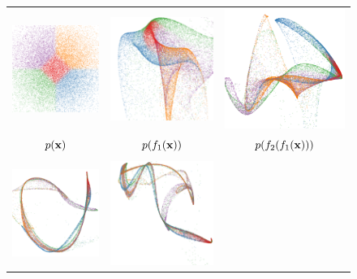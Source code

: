 \documentclass{article}
\begin{document}
\begin{figure}
\centering
\begin{tabular}{ccc}
\includegraphics[width=0.3\columnwidth]{figures/deep_draws/deep_gp_sample_layer_1} &
\includegraphics[width=0.3\columnwidth]{figures/deep_draws/deep_gp_sample_layer_2} &
\includegraphics[width=0.3\columnwidth]{figures/deep_draws/deep_gp_sample_layer_3} \\
$p({\bf{x}})$ & $p(f_1({\bf{x}}))$ & $p(f_2(f_1({\bf{x}})))$ \\ \\
\includegraphics[width=0.3\columnwidth]{figures/deep_draws/deep_gp_sample_layer_4} &
\includegraphics[width=0.3\columnwidth]{figures/deep_draws/deep_gp_sample_layer_5} &

\end{tabular}
\end{figure}
\end{document}
